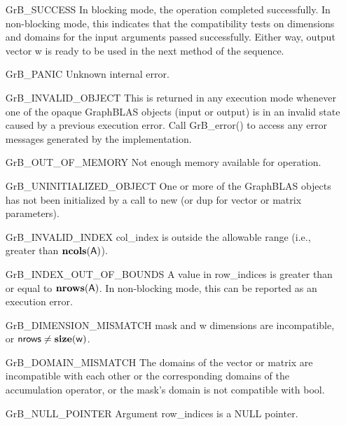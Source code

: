 \begin{itemize}[leftmargin=2.1in]
    \item[{\sf GrB\_SUCCESS}]         In blocking mode, the operation completed
    successfully. In non-blocking mode, this indicates that the compatibility 
    tests on dimensions and domains for the input arguments passed successfully. 
    Either way, output vector {\sf w} is ready to be used in the next method of 
    the sequence.

    \item[{\sf GrB\_PANIC}]            Unknown internal error.
    
    \item[{\sf GrB\_INVALID\_OBJECT}] This is returned in any execution mode 
    whenever one of the opaque GraphBLAS objects (input or output) is in an invalid 
    state caused by a previous execution error.  Call {\sf GrB\_error()} to access 
    any error messages generated by the implementation.

    \item[{\sf GrB\_OUT\_OF\_MEMORY}]  Not enough memory available for operation.
    
    \item[{\sf GrB\_UNINITIALIZED\_OBJECT}] One or more of the GraphBLAS objects 
    has not been initialized by a call to {\sf new} (or {\sf dup} for vector
    or matrix parameters).

    \item[{\sf GrB\_INVALID\_INDEX}]    {\sf col\_index} is outside the allowable 
    range (i.e., greater than $\bold{ncols}({\sf A})$).

    \item[{\sf GrB\_INDEX\_OUT\_OF\_BOUNDS}]  A value in {\sf row\_indices} 
    is greater than or equal to $\bold{nrows}({\sf A})$.  In 
    non-blocking mode, this can be reported as an execution error.
    
    \item[{\sf GrB\_DIMENSION\_MISMATCH}] {\sf mask} and {\sf w} dimensions are
    incompatible, or ${\sf nrows} \neq \bold{size}({\sf w})$.

    \item[{\sf GrB\_DOMAIN\_MISMATCH}]     The domains of the vector or matrix
    are incompatible with each other or the corresponding domains of the 
    accumulation operator, or the mask's domain is not compatible with {\sf bool}.

    \item[{\sf GrB\_NULL\_POINTER}] Argument {\sf row\_indices} is a {\sf NULL} pointer.
\end{itemize}

